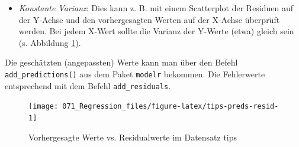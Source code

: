 \documentclass[12pt,ngerman,]{book}
\makeatletter
\newenvironment{Shaded}{\begin{snugshade}}{\end{snugshade}}
\newcommand{\KeywordTok}[1]{\textcolor[rgb]{0.13,0.29,0.53}{\textbf{#1}}}
\newcommand{\DataTypeTok}[1]{\textcolor[rgb]{0.13,0.29,0.53}{#1}}
\newcommand{\StringTok}[1]{\textcolor[rgb]{0.31,0.60,0.02}{#1}}
\newcommand{\CommentTok}[1]{\textcolor[rgb]{0.56,0.35,0.01}{\textit{#1}}}
\newcommand{\OperatorTok}[1]{\textcolor[rgb]{0.81,0.36,0.00}{\textbf{#1}}}
\newcommand{\NormalTok}[1]{#1}
\providecommand{\tightlist}{%
  \setlength{\itemsep}{0pt}\setlength{\parskip}{0pt}}
\newenvironment{kframe}{%
\medskip{}
\setlength{\fboxsep}{.8em}
 \def\at@end@of@kframe{}%
 \ifinner\ifhmode%
  \def\at@end@of@kframe{\end{minipage}}%
  \begin{minipage}{\columnwidth}%
 \fi\fi%
 \def\FrameCommand##1{\hskip\@totalleftmargin \hskip-\fboxsep
 \colorbox{shadecolor}{##1}\hskip-\fboxsep
     \hskip-\linewidth \hskip-\@totalleftmargin \hskip\columnwidth}%
 \MakeFramed {\advance\hsize-\width
   \@totalleftmargin\z@ \linewidth\hsize
   \@setminipage}}%
 {\par\unskip\endMakeFramed%
 \at@end@of@kframe}
\renewenvironment{Shaded}{\begin{kframe}}{\end{kframe}}
\theoremstyle{definition}
\theoremstyle{definition}
\theoremstyle{remark}
\makeatother
\begin{document}
\begin{Shaded}
\end{Shaded}

\begin{itemize}
\tightlist
\item
  \emph{Konstante Varianz}: Dies kann z. B. mit einem Scatterplot der
  Residuen auf der Y-Achse und den vorhergesagten Werten auf der X-Achse
  überprüft werden. Bei jedem X-Wert sollte die Varianz der Y-Werte
  (etwa) gleich sein (s. Abbildung \ref{fig:tips-preds-resid}).
\end{itemize}

Die geschätzten (angepassten) Werte kann man über den Befehl
\texttt{add\_predictions()} aus dem Paket \texttt{modelr} bekommen. Die
Fehlerwerte entsprechend mit dem Befehl \texttt{add\_residuals}.

\begin{Shaded}
\end{Shaded}

\begin{figure}

{\centering \texttt{[image: 071\_Regression\_files/figure-latex/tips-preds-resid-1]} 

}

\caption{Vorhergesagte Werte vs. Residualwerte im Datensatz tips}\label{fig:tips-preds-resid}
\end{figure}
\end{document}
